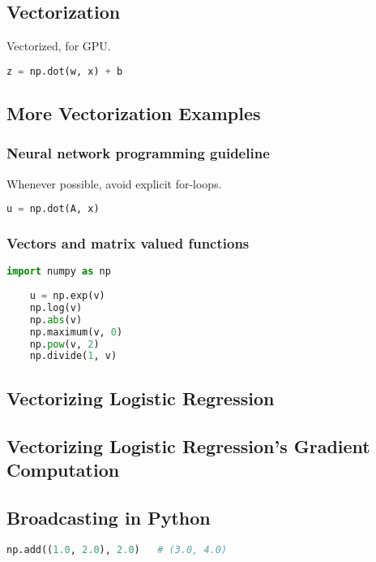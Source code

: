 \subsection{Vectorization}
Vectorized, for GPU.
\begin{lstlisting}[language={python},tabsize=4]
	z = np.dot(w, x) + b
\end{lstlisting}


\subsection{More Vectorization Examples}
\subsubsection{Neural network programming guideline}
Whenever possible, avoid explicit for-loops.
\begin{lstlisting}[language={python},tabsize=4]
	u = np.dot(A, x)
\end{lstlisting}

\subsubsection{Vectors and matrix valued functions}
\begin{lstlisting}[language={python},tabsize=4]
	import numpy as np
	
	u = np.exp(v)
	np.log(v)
	np.abs(v)
	np.maximum(v, 0)
	np.pow(v, 2)
	np.divide(1, v)
\end{lstlisting}


\subsection{Vectorizing Logistic Regression}


\subsection{Vectorizing Logistic Regression's Gradient Computation}


\subsection{Broadcasting in Python}
\begin{lstlisting}[language={python},tabsize=4]
	np.add((1.0, 2.0), 2.0)   # (3.0, 4.0)
\end{lstlisting}


